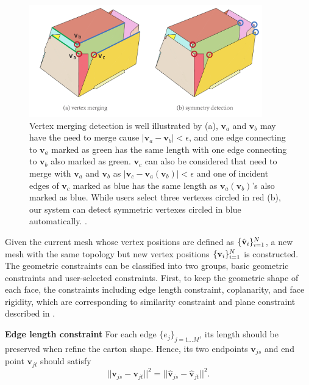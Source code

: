 \begin{figure}
	\centering
	\includegraphics[width=0.9\textwidth]{images/suggestion}
	\caption{Vertex merging detection is well illustrated by (a), $\mathbf{v}_a$ and $\mathbf{v}_b$ may have the need to merge cause $|\mathbf{v}_a-\mathbf{v}_b|<\epsilon$, and one edge connecting to $\mathbf{v}_a$ marked as green has the same length with one edge connecting to $\mathbf{v}_b$ also marked as green. $\mathbf{v}_c$ can also be considered that need to merge with $\mathbf{v}_a$ and $\mathbf{v}_b$ as $|\mathbf{v}_c-\mathbf{v}_a(\mathbf{v}_b)|<\epsilon$ and one of incident edges of $\mathbf{v}_c$ marked as blue has the same length as $\mathbf{v}_a(\mathbf{v}_b)$'s also marked as blue. While users select three vertexes circled in red (b), our system can detect symmetric vertexes circled in blue automatically. .}
	\label{fig:suggestion}
\end{figure}

Given the current mesh whose vertex positions are defined as $\{\hat{\mathbf{v}}_i\}^{N}_{i=1}$, a new mesh with the same topology but new vertex positions $\{\mathbf{v}_i\}^{N}_{i=1}$ is constructed.
%
The geometric constraints can be classified into two groups, basic geometric constraints and user-selected constraints. 
First, to keep the geometric shape of each face, the constraints including edge length constraint, coplanarity, and face rigidity, which are corresponding to similarity constraint and plane constraint described in \cite{Bouaziz:2012:SSD:2346796.2346802}. 

\noindent
\textbf{Edge length constraint} 
For each edge $\{e_j\}_{j=1...M}$, its length should be preserved when refine the carton shape.
Hence, its two endpoints $\mathbf{v}_{js}$ and end point $\mathbf{v}_{jt}$ should satisfy 
\begin{equation}
||\mathbf{v}_{js} - \mathbf{v}_{jt}||^2 = ||\mathbf{\hat{v}}_{js} - \mathbf{\hat{v}}_{jt}||^2.
\label{equ:edge}
\end{equation}

